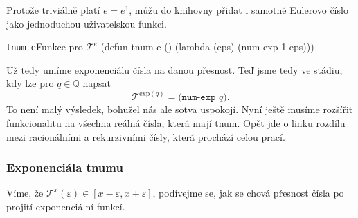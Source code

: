 \begin{remark}
Protože triviálně platí $e = e^1$, můžu do knihovny přidat i samotné Eulerovo číslo jako jednoduchou uživatelskou funkci.
\begin{lispcode}{\texttt{tnum-e}}{Funkce pro $\mathcal{T}^e$}
(\textcolor{funkcionalni}{defun} \textcolor{pojmenovan}{tnum-e} ()
  (\textcolor{funkcionalni}{lambda} (eps)
    (\textcolor{moje}{num-exp} 1 eps)))
\end{lispcode}
\end{remark}

Už tedy umíme exponenciálu čísla na danou přesnost. Teď jsme tedy ve stádiu, kdy lze pro $q\in\mathbb{Q}$ napsat
\begin{equation}
\mathcal{T}^{\mathrm{exp}(q)}=\texttt{(num-exp } q \texttt{)}.
\end{equation}
To není malý výsledek, bohužel nás ale sotva uspokojí. Nyní ještě musíme rozšířit funkcionalitu na všechna reálná čísla, která mají tnum. Opět jde o linku rozdílu mezi racionálními a rekurzivními čísly, která prochází celou prací.

\subsubsection{Exponenciála tnumu}
Víme, že $\mathcal{T}^x(\varepsilon) \in [x-\varepsilon,x+\varepsilon]$, podívejme se, jak se chová přesnost čísla po projití exponenciální funkcí.


